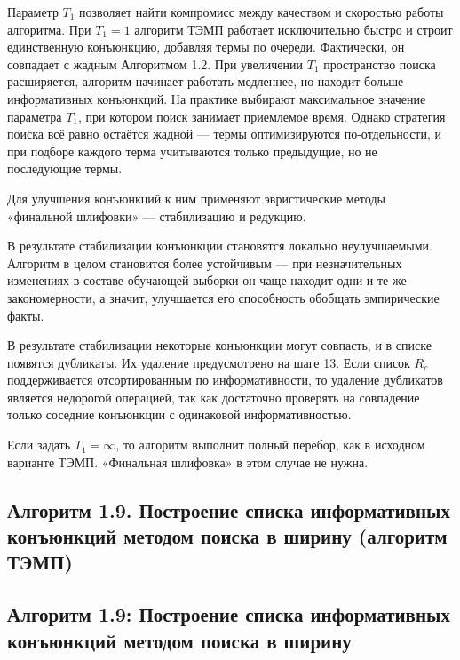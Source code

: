Параметр $T_1$ позволяет найти компромисс между качеством и скоростью работы алгоритма. При $T_1 = 1$ алгоритм ТЭМП работает исключительно быстро и строит единственную конъюнкцию, добавляя термы по очереди. Фактически, он совпадает с жадным Алгоритмом 1.2. При увеличении $T_1$ пространство поиска расширяется, алгоритм начинает работать медленнее, но находит больше информативных конъюнкций. На практике выбирают максимальное значение параметра $T_1$, при котором поиск занимает приемлемое время. Однако стратегия поиска всё равно остаётся жадной — термы оптимизируются по-отдельности, и при подборе каждого терма учитываются только предыдущие, но не последующие термы.

Для улучшения конъюнкций к ним применяют эвристические методы «финальной шлифовки» — стабилизацию и редукцию.

В результате стабилизации конъюнкции становятся локально неулучшаемыми. Алгоритм в целом становится более устойчивым — при незначительных изменениях в составе обучающей выборки он чаще находит одни и те же закономерности, а значит, улучшается его способность обобщать эмпирические факты.

В результате стабилизации некоторые конъюнкции могут совпасть, и в списке появятся дубликаты. Их удаление предусмотрено на шаге 13. Если список $R_c$ поддерживается отсортированным по информативности, то удаление дубликатов является недорогой операцией, так как достаточно проверять на совпадение только соседние конъюнкции с одинаковой информативностью.

Если задать $T_1 = \infty$, то алгоритм выполнит полный перебор, как в исходном варианте ТЭМП. «Финальная шлифовка» в этом случае не нужна.

\subsection{Алгоритм 1.9. Построение списка информативных конъюнкций методом поиска в ширину (алгоритм ТЭМП)}


\subsection{Алгоритм 1.9: Построение списка информативных конъюнкций методом поиска в ширину}

